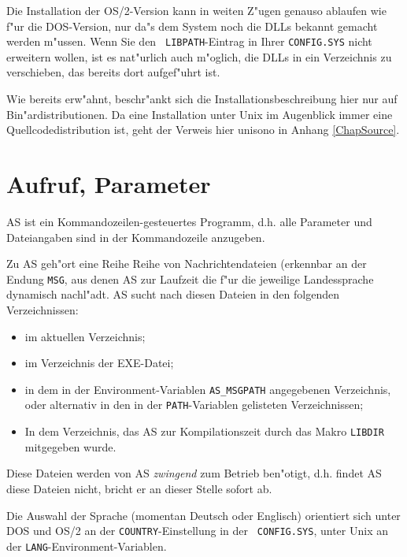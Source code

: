 \documentclass[12pt,a4paper,twoside]{report}
\begin{document}
Die Installation der OS/2-Version  kann in weiten
Z"ugen genauso ablaufen wie f"ur die DOS-Version, nur da"s dem System noch
die DLLs bekannt gemacht werden m"ussen.  Wenn Sie den {\tt
LIBPATH}-Eintrag in Ihrer {\tt CONFIG.SYS} nicht erweitern wollen, ist es
nat"urlich auch m"oglich, die DLLs in ein Verzeichnis zu verschieben, das
bereits dort aufgef"uhrt ist.

Wie bereits erw"ahnt, beschr"ankt sich die Installationsbeschreibung hier
nur auf Bin"ardistributionen.  Da eine Installation unter Unix
 im Augenblick immer eine Quellcodedistribution ist,
geht der Verweis hier unisono in Anhang \ref{ChapSource}.


\section{Aufruf, Parameter}\label{SectCallConvention}

AS ist ein Kommandozeilen-gesteuertes Programm, d.h. alle Parameter
und Dateiangaben sind in der Kommandozeile anzugeben.

Zu AS geh"ort eine Reihe Reihe von Nachrichtendateien (erkennbar an der
Endung {\tt MSG}, aus denen AS zur Laufzeit die f"ur die jeweilige
Landessprache dynamisch nachl"adt.  AS sucht nach diesen Dateien in den
folgenden Verzeichnissen:
\begin{itemize}
\item{im aktuellen Verzeichnis;}
\item{im Verzeichnis der EXE-Datei;}
\item{in dem in der Environment-Variablen {\tt AS\_MSGPATH} angegebenen
      Verzeichnis, oder alternativ in den in der {\tt PATH}-Variablen
      gelisteten Verzeichnissen;}
\item{In dem Verzeichnis, das AS zur Kompilationszeit durch das
      Makro {\tt LIBDIR} mitgegeben wurde.}
\end{itemize}
Diese Dateien werden von AS {\em zwingend} zum Betrieb ben"otigt, d.h.
findet AS diese Dateien nicht, bricht er an dieser Stelle sofort ab.

Die Auswahl der Sprache (momentan Deutsch oder Englisch) orientiert sich
unter DOS und OS/2 an der {\tt COUNTRY}-Einstellung in der {\tt
CONFIG.SYS}, unter Unix an der {\tt LANG}-Environment-Variablen.
\end{document}
